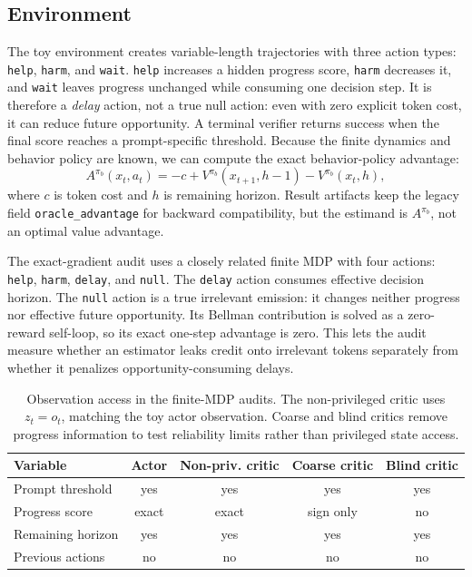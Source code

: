 \documentclass[11pt]{article}
\begin{document}
\subsection{Environment}

The toy environment creates variable-length trajectories with three action
types: \texttt{help}, \texttt{harm}, and \texttt{wait}. \texttt{help} increases
a hidden progress score, \texttt{harm} decreases it, and \texttt{wait} leaves
progress unchanged while consuming one decision step. It is therefore a
\emph{delay} action, not a true null action: even with zero explicit token cost,
it can reduce future opportunity. A terminal verifier returns success when the
final score reaches a prompt-specific threshold. Because the finite dynamics
and behavior policy are known, we can compute the exact behavior-policy
advantage:
\begin{equation}
  A^{\pi_b}(x_t,a_t)
  = -c + V^{\pi_b}(x_{t+1},h-1) - V^{\pi_b}(x_t,h),
\end{equation}
where $c$ is token cost and $h$ is remaining horizon. Result artifacts keep the
legacy field \nolinkurl{oracle_advantage} for backward compatibility, but the
estimand is $A^{\pi_b}$, not an optimal value advantage.

The exact-gradient audit uses a closely related finite MDP with four actions:
\texttt{help}, \texttt{harm}, \texttt{delay}, and \texttt{null}. The
\texttt{delay} action consumes effective decision horizon. The \texttt{null}
action is a true irrelevant emission: it changes neither progress nor effective
future opportunity. Its Bellman contribution is solved as a zero-reward
self-loop, so its exact one-step advantage is zero. This lets the audit measure
whether an estimator leaks credit onto irrelevant tokens separately from
whether it penalizes opportunity-consuming delays.

\begin{table}[!htbp]
\centering
\caption{Observation access in the finite-MDP audits. The non-privileged critic
uses $z_t=o_t$, matching the toy actor observation. Coarse and blind critics
remove progress information to test reliability limits rather than privileged
state access.}
\label{tab:observability}
\small
\begin{tabular}{@{}lcccc@{}}
\toprule
Variable & Actor & Non-priv. critic & Coarse critic & Blind critic \\
\midrule
Prompt threshold & yes & yes & yes & yes \\
Progress score & exact & exact & sign only & no \\
Remaining horizon & yes & yes & yes & yes \\
Previous actions & no & no & no & no \\
\bottomrule
\end{tabular}
\end{table}
\end{document}
